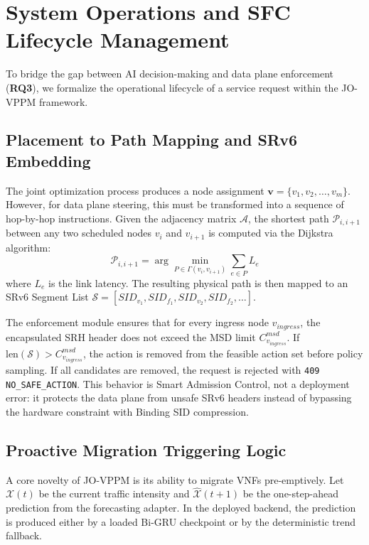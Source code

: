 \documentclass[12pt, a4paper, reqno, oneside]{book}
\begin{document}
\section{System Operations and SFC Lifecycle Management}
To bridge the gap between AI decision-making and data plane enforcement (\textbf{RQ3}), we formalize the operational lifecycle of a service request within the JO-VPPM framework.

\subsection{Placement to Path Mapping and SRv6 Embedding}
The joint optimization process produces a node assignment $\mathbf{v} = \{v_1, v_2, \dots, v_m\}$. However, for data plane steering, this must be transformed into a sequence of hop-by-hop instructions. Given the adjacency matrix $\mathcal{A}$, the shortest path $\mathcal{P}_{i, i+1}$ between any two scheduled nodes $v_i$ and $v_{i+1}$ is computed via the Dijkstra algorithm:
\begin{equation}
\mathcal{P}_{i, i+1} = \arg \min_{P \in \Gamma(v_i, v_{i+1})} \sum_{e \in P} L_e
\end{equation}
where $L_e$ is the link latency. The resulting physical path is then mapped to an SRv6 Segment List $\mathcal{S} = [SID_{v_1}, SID_{f_1}, SID_{v_2}, SID_{f_2}, \dots]$. 

The enforcement module ensures that for every ingress node $v_{ingress}$, the encapsulated SRH header does not exceed the MSD limit $C_{v_{ingress}}^{msd}$. If $\text{len}(\mathcal{S}) > C_{v_{ingress}}^{msd}$, the action is removed from the feasible action set before policy sampling. If all candidates are removed, the request is rejected with \texttt{409 NO\_SAFE\_ACTION}. This behavior is Smart Admission Control, not a deployment error: it protects the data plane from unsafe SRv6 headers instead of bypassing the hardware constraint with Binding SID compression.

\subsection{Proactive Migration Triggering Logic}
A core novelty of JO-VPPM is its ability to migrate VNFs pre-emptively. Let $\mathcal{X}(t)$ be the current traffic intensity and $\hat{\mathcal{X}}(t+1)$ be the one-step-ahead prediction from the forecasting adapter. In the deployed backend, the prediction is produced either by a loaded Bi-GRU checkpoint or by the deterministic trend fallback.
\end{document}
